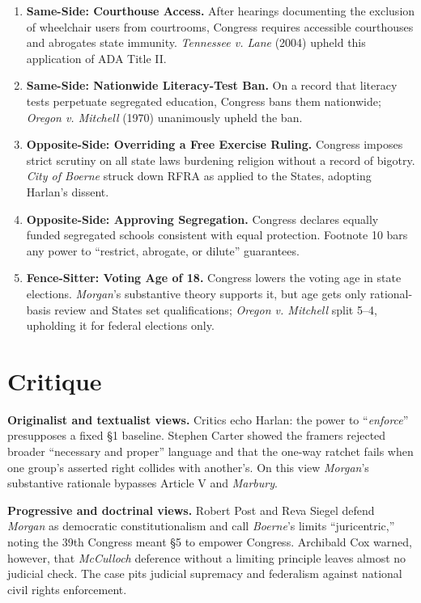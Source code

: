\documentclass[12pt]{article}
\begin{document}
\begin{enumerate}
\item \textbf{Same-Side: Courthouse Access.} After hearings documenting the exclusion of wheelchair users from courtrooms, Congress requires accessible courthouses and abrogates state immunity. \textit{Tennessee v. Lane} (2004) upheld this application of ADA Title II.
\item \textbf{Same-Side: Nationwide Literacy-Test Ban.} On a record that literacy tests perpetuate segregated education, Congress bans them nationwide; \textit{Oregon v. Mitchell} (1970) unanimously upheld the ban.
\item \textbf{Opposite-Side: Overriding a Free Exercise Ruling.} Congress imposes strict scrutiny on all state laws burdening religion without a record of bigotry. \textit{City of Boerne} struck down RFRA as applied to the States, adopting Harlan's dissent.
\item \textbf{Opposite-Side: Approving Segregation.} Congress declares equally funded segregated schools consistent with equal protection. Footnote 10 bars any power to ``restrict, abrogate, or dilute'' guarantees.
\item \textbf{Fence-Sitter: Voting Age of 18.} Congress lowers the voting age in state elections. \textit{Morgan}'s substantive theory supports it, but age gets only rational-basis review and States set qualifications; \textit{Oregon v. Mitchell} split 5--4, upholding it for federal elections only.
\end{enumerate}

\section{Critique}

\textbf{Originalist and textualist views.} Critics echo Harlan: the power to ``\textit{enforce}'' presupposes a fixed \S 1 baseline. Stephen Carter showed the framers rejected broader ``necessary and proper'' language and that the one-way ratchet fails when one group's asserted right collides with another's. On this view \textit{Morgan}'s substantive rationale bypasses Article V and \textit{Marbury}.

\textbf{Progressive and doctrinal views.} Robert Post and Reva Siegel defend \textit{Morgan} as democratic constitutionalism and call \textit{Boerne}'s limits ``juricentric,'' noting the 39th Congress meant \S 5 to empower Congress. Archibald Cox warned, however, that \textit{McCulloch} deference without a limiting principle leaves almost no judicial check. The case pits judicial supremacy and federalism against national civil rights enforcement.
\end{document}

